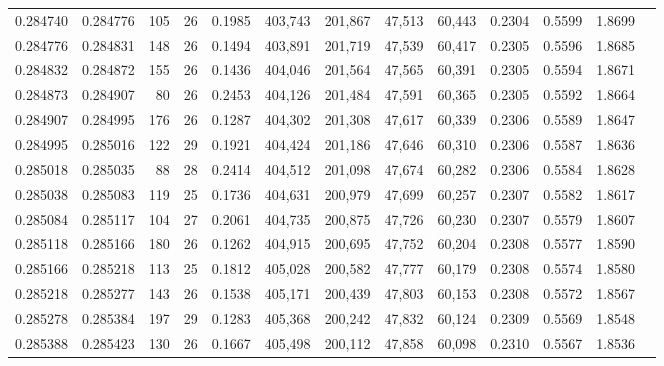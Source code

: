 \begin{tabular}{rrrrrrrrrrrrr}
0.284740 & 0.284776 &   105 &  26 &                                     0.1985 & 403,743 & 201,867 &  47,513 &  60,443 & 0.2304 & 0.5599 & 1.8699 \\
0.284776 & 0.284831 &   148 &  26 &                                     0.1494 & 403,891 & 201,719 &  47,539 &  60,417 & 0.2305 & 0.5596 & 1.8685 \\
0.284832 & 0.284872 &   155 &  26 &                                     0.1436 & 404,046 & 201,564 &  47,565 &  60,391 & 0.2305 & 0.5594 & 1.8671 \\
0.284873 & 0.284907 &    80 &  26 &                                     0.2453 & 404,126 & 201,484 &  47,591 &  60,365 & 0.2305 & 0.5592 & 1.8664 \\
0.284907 & 0.284995 &   176 &  26 &                                     0.1287 & 404,302 & 201,308 &  47,617 &  60,339 & 0.2306 & 0.5589 & 1.8647 \\
0.284995 & 0.285016 &   122 &  29 &                                     0.1921 & 404,424 & 201,186 &  47,646 &  60,310 & 0.2306 & 0.5587 & 1.8636 \\
0.285018 & 0.285035 &    88 &  28 &                                     0.2414 & 404,512 & 201,098 &  47,674 &  60,282 & 0.2306 & 0.5584 & 1.8628 \\
0.285038 & 0.285083 &   119 &  25 &                                     0.1736 & 404,631 & 200,979 &  47,699 &  60,257 & 0.2307 & 0.5582 & 1.8617 \\
0.285084 & 0.285117 &   104 &  27 &                                     0.2061 & 404,735 & 200,875 &  47,726 &  60,230 & 0.2307 & 0.5579 & 1.8607 \\
0.285118 & 0.285166 &   180 &  26 &                                     0.1262 & 404,915 & 200,695 &  47,752 &  60,204 & 0.2308 & 0.5577 & 1.8590 \\
0.285166 & 0.285218 &   113 &  25 &                                     0.1812 & 405,028 & 200,582 &  47,777 &  60,179 & 0.2308 & 0.5574 & 1.8580 \\
0.285218 & 0.285277 &   143 &  26 &                                     0.1538 & 405,171 & 200,439 &  47,803 &  60,153 & 0.2308 & 0.5572 & 1.8567 \\
0.285278 & 0.285384 &   197 &  29 &                                     0.1283 & 405,368 & 200,242 &  47,832 &  60,124 & 0.2309 & 0.5569 & 1.8548 \\
0.285388 & 0.285423 &   130 &  26 &                                     0.1667 & 405,498 & 200,112 &  47,858 &  60,098 & 0.2310 & 0.5567 & 1.8536 \\

\end{tabular}
